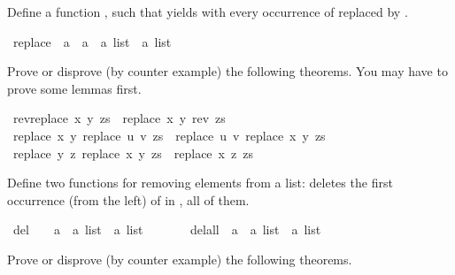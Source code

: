 %
\begin{isabellebody}%
\def\isabellecontext{Aufgabe{\isadigit{1}}}%
\isamarkupfalse%
%
\isamarkuptrue%
%
\begin{isamarkuptext}%
Define a function , such that 
yields  with every occurrence of  replaced by .%
\end{isamarkuptext}%
\isamarkuptrue%
\ replace\ {\isacharcolon}{\isacharcolon}\ {\isachardoublequote}{\isacharprime}a\ {\isasymRightarrow}\ {\isacharprime}a\ {\isasymRightarrow}\ {\isacharprime}a\ list\ {\isasymRightarrow}\ {\isacharprime}a\ list{\isachardoublequote}\isamarkupfalse%
%
\begin{isamarkuptext}%
Prove or disprove (by counter example) the following theorems.
You may have to prove some lemmas first.%
\end{isamarkuptext}%
\isamarkuptrue%
\ {\isachardoublequote}rev{\isacharparenleft}replace\ x\ y\ zs{\isacharparenright}\ {\isacharequal}\ replace\ x\ y\ {\isacharparenleft}rev\ zs{\isacharparenright}{\isachardoublequote}\isamarkupfalse%
\isanewline
\isamarkupfalse%
\ {\isachardoublequote}replace\ x\ y\ {\isacharparenleft}replace\ u\ v\ zs{\isacharparenright}\ {\isacharequal}\ replace\ u\ v\ {\isacharparenleft}replace\ x\ y\ zs{\isacharparenright}{\isachardoublequote}\isamarkupfalse%
\isanewline
\isamarkupfalse%
\ {\isachardoublequote}replace\ y\ z\ {\isacharparenleft}replace\ x\ y\ zs{\isacharparenright}\ {\isacharequal}\ replace\ x\ z\ zs{\isachardoublequote}\isamarkupfalse%
\isamarkupfalse%
%
\begin{isamarkuptext}%
Define two functions for removing elements from a list:
 deletes the first occurrence (from the left) of
 in ,  all of them.%
\end{isamarkuptext}%
\isamarkuptrue%
\ del{}\ \ \ {\isacharcolon}{\isacharcolon}\ {\isachardoublequote}{\isacharprime}a\ {\isasymRightarrow}\ {\isacharprime}a\ list\ {\isasymRightarrow}\ {\isacharprime}a\ list{\isachardoublequote}\isanewline
\ \ \ \ \ \ \ delall\ {\isacharcolon}{\isacharcolon}\ {\isachardoublequote}{\isacharprime}a\ {\isasymRightarrow}\ {\isacharprime}a\ list\ {\isasymRightarrow}\ {\isacharprime}a\ list{\isachardoublequote}\isamarkupfalse%
%
\begin{isamarkuptext}%
Prove or disprove (by counter example) the following theorems.%

\end{isamarkuptext}
\end{isabellebody}
